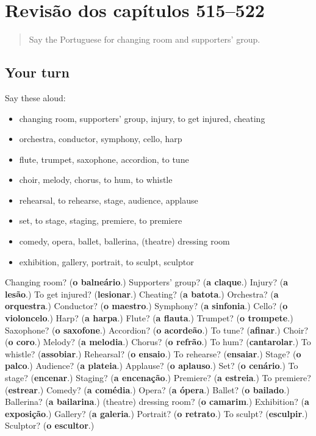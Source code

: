 \section[(dialogue)]{Revisão dos capítulos 515–522}

\label{lesson:PT-R522-revisao-515-522}



\begin{quote}
Say the Portuguese for changing room and supporters' group.
\end{quote}

\subsection*{Your turn}
Say these aloud:

\begin{itemize}
\raggedright
  \item changing room, supporters' group, injury, to get injured, cheating
  \item orchestra, conductor, symphony, cello, harp
  \item flute, trumpet, saxophone, accordion, to tune
  \item choir, melody, chorus, to hum, to whistle
  \item rehearsal, to rehearse, stage, audience, applause
  \item set, to stage, staging, premiere, to premiere
  \item comedy, opera, ballet, ballerina, (theatre) dressing room
  \item exhibition, gallery, portrait, to sculpt, sculptor
\end{itemize}

\begin{tcolorbox}[breakable,colback=teal!4,colframe=teal!35!black,title={Before you move on}]
Changing room? (\textbf{o balneário}.) Supporters' group? (\textbf{a claque}.) Injury? (\textbf{a lesão}.) To get injured? (\textbf{lesionar}.) Cheating? (\textbf{a batota}.) Orchestra? (\textbf{a orquestra}.) Conductor? (\textbf{o maestro}.) Symphony? (\textbf{a sinfonia}.) Cello? (\textbf{o violoncelo}.) Harp? (\textbf{a harpa}.) Flute? (\textbf{a flauta}.) Trumpet? (\textbf{o trompete}.) Saxophone? (\textbf{o saxofone}.) Accordion? (\textbf{o acordeão}.) To tune? (\textbf{afinar}.) Choir? (\textbf{o coro}.) Melody? (\textbf{a melodia}.) Chorus? (\textbf{o refrão}.) To hum? (\textbf{cantarolar}.) To whistle? (\textbf{assobiar}.) Rehearsal? (\textbf{o ensaio}.) To rehearse? (\textbf{ensaiar}.) Stage? (\textbf{o palco}.) Audience? (\textbf{a plateia}.) Applause? (\textbf{o aplauso}.) Set? (\textbf{o cenário}.) To stage? (\textbf{encenar}.) Staging? (\textbf{a encenação}.) Premiere? (\textbf{a estreia}.) To premiere? (\textbf{estrear}.) Comedy? (\textbf{a comédia}.) Opera? (\textbf{a ópera}.) Ballet? (\textbf{o bailado}.) Ballerina? (\textbf{a bailarina}.) (theatre) dressing room? (\textbf{o camarim}.) Exhibition? (\textbf{a exposição}.) Gallery? (\textbf{a galeria}.) Portrait? (\textbf{o retrato}.) To sculpt? (\textbf{esculpir}.) Sculptor? (\textbf{o escultor}.)
\end{tcolorbox}
